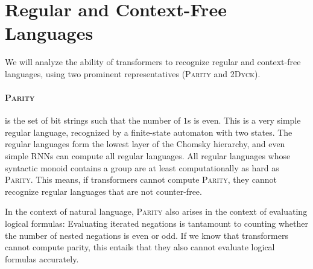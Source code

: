 \documentclass[11pt,a4paper]{article}
\begin{document}
\section{Regular and Context-Free Languages} %

We will analyze the ability of transformers to recognize regular and context-free languages, using two prominent representatives (\textsc{Parity} and \textsc{2Dyck}). %


\paragraph{\textsc{Parity}} is the set of bit strings such that the number of $1$s is even.
This is a very simple regular language, recognized by a finite-state automaton with two states.
The regular languages form the lowest layer of the Chomsky hierarchy, and even simple RNNs can compute all regular languages.
All regular languages whose syntactic monoid contains a group are at least computationally as hard as \textsc{Parity}.
This means, if transformers cannot compute \textsc{Parity}, they cannot recognize regular languages that are not counter-free.

In the context of natural language, \textsc{Parity} also arises in the context of evaluating logical formulas:
Evaluating iterated negations is tantamount to counting whether the number of nested negations is even or odd.
If we know that transformers cannot compute parity, this entails that they also cannot evaluate logical formulas accurately.



\end{document}
